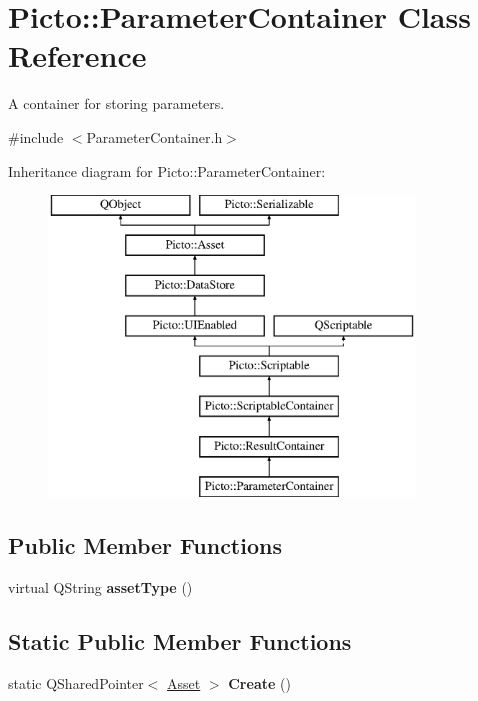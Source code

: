 \hypertarget{class_picto_1_1_parameter_container}{\section{Picto\-:\-:Parameter\-Container Class Reference}
\label{class_picto_1_1_parameter_container}
}


A container for storing parameters.  




{\ttfamily \#include $<$Parameter\-Container.\-h$>$}

Inheritance diagram for Picto\-:\-:Parameter\-Container\-:\begin{figure}[H]
\begin{center}
\leavevmode
\includegraphics[height=8.000000cm]{class_picto_1_1_parameter_container}
\end{center}
\end{figure}
\subsection*{Public Member Functions}
\begin{DoxyCompactItemize}
\item 
\hypertarget{class_picto_1_1_parameter_container_a12d4f7aa9eb57c80eb6bffd8d1ca26b9}{virtual Q\-String {\bfseries asset\-Type} ()}\label{class_picto_1_1_parameter_container_a12d4f7aa9eb57c80eb6bffd8d1ca26b9}

\end{DoxyCompactItemize}
\subsection*{Static Public Member Functions}
\begin{DoxyCompactItemize}
\item 
\hypertarget{class_picto_1_1_parameter_container_a155831893a2c67caa2352df513a66c0d}{static Q\-Shared\-Pointer$<$ \hyperlink{class_picto_1_1_asset}{Asset} $>$ {\bfseries Create} ()}\label{class_picto_1_1_parameter_container_a155831893a2c67caa2352df513a66c0d}

\end{DoxyCompactItemize}

